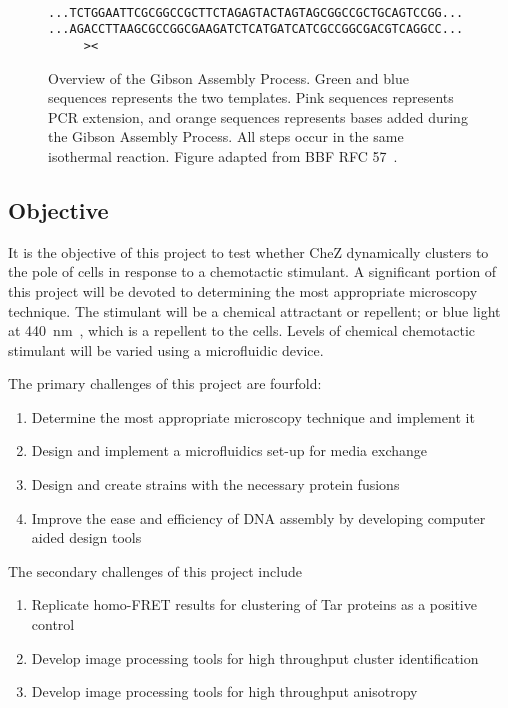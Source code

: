 \documentclass[../main.tex]{subfiles}
\begin{document}
\begin{figure}[p]
{{\\
\texttt{\color{DarkGreen}...TCTGGAATTCGCGGCCGCTTCTAGAG\color{RubineRed}TACTAGTAGCGGCCGC\color{YellowOrange}TGCAGTC\color{DarkBlue}CGG...}
\\
\texttt{\color{DarkGreen}...AGA\color{YellowOrange}CCTTAAG\color{RubineRed}CGCCGGCGAAGATCTC\color{DarkBlue}ATGATCATCGCCGGCGACGTCAGGCC...}
\\
\texttt{\color{black}\ \ \ \ \ ><\ \ \ }
}
\label{fig:gibson:5}
}
\caption[Overview of the Gibson Assembly Process]{Overview of the Gibson Assembly Process. Green and blue sequences  represents the two templates. Pink sequences represents PCR extension, and orange sequences represents bases added during the Gibson Assembly Process. All steps occur in the same isothermal reaction. Figure adapted from BBF RFC 57~\citep{rfc57}.}
\label{fig:gibson}
\end{figure}

\subsection{Objective}
It is the objective of this project to test whether CheZ dynamically clusters to the pole of \ecoli cells in response to a chemotactic stimulant. A significant portion of this project will be devoted to determining the most appropriate microscopy technique. The stimulant will be a chemical attractant or repellent; or blue light at \SI{440}{\nano\meter}~\citep{wright06}, which is a repellent to the cells. Levels of chemical chemotactic stimulant will be varied using a microfluidic device.

The primary challenges of this project are fourfold:
\begin{enumerate}
\item Determine the most appropriate microscopy technique and implement it
\item Design and implement a microfluidics set-up for media exchange
\item Design and create \ecoli strains with the necessary protein fusions
\item Improve the ease and efficiency of DNA assembly by developing computer aided design tools
\end{enumerate}

The secondary challenges of this project include
\begin{enumerate}
\item Replicate homo-FRET results for clustering of Tar proteins as a positive control
\item Develop image processing tools for high throughput cluster identification
\item Develop image processing tools for high throughput anisotropy
\end{enumerate}
\end{document}
